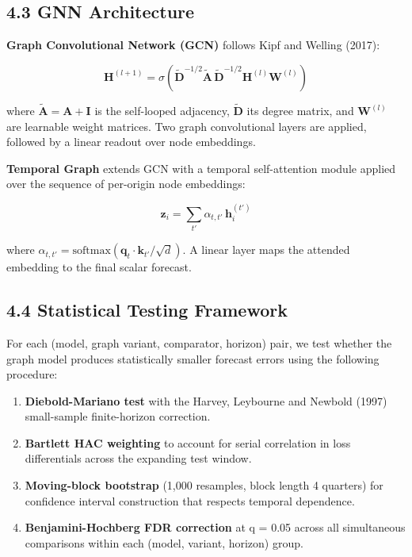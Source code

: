 \documentclass[
  11pt,
  a4paper]{article}
\providecommand{\tightlist}{%
  \setlength{\itemsep}{0pt}\setlength{\parskip}{0pt}}
\begin{document}
\subsection{4.3 GNN Architecture}\label{gnn-architecture}

\textbf{Graph Convolutional Network (GCN)} follows Kipf and Welling
(2017):

\[\mathbf{H}^{(l+1)} = \sigma\!\left(\tilde{\mathbf{D}}^{-1/2}\tilde{\mathbf{A}}\,\tilde{\mathbf{D}}^{-1/2}\mathbf{H}^{(l)}\mathbf{W}^{(l)}\right)\]

where \(\tilde{\mathbf{A}} = \mathbf{A} + \mathbf{I}\) is the
self-looped adjacency, \(\tilde{\mathbf{D}}\) its degree matrix, and
\(\mathbf{W}^{(l)}\) are learnable weight matrices. Two graph
convolutional layers are applied, followed by a linear readout over node
embeddings.

\textbf{Temporal Graph} extends GCN with a temporal self-attention
module applied over the sequence of per-origin node embeddings:

\[\mathbf{z}_i = \sum_{t'} \alpha_{t,t'}\,\mathbf{h}_i^{(t')}\]

where
\(\alpha_{t,t'} = \mathrm{softmax}(\mathbf{q}_t \cdot \mathbf{k}_{t'} / \sqrt{d})\).
A linear layer maps the attended embedding to the final scalar forecast.

\subsection{4.4 Statistical Testing
Framework}\label{statistical-testing-framework}

For each (model, graph variant, comparator, horizon) pair, we test
whether the graph model produces statistically smaller forecast errors
using the following procedure:

\begin{enumerate}
\def\labelenumi{\arabic{enumi}.}
\tightlist
\item
  \textbf{Diebold-Mariano test} with the Harvey, Leybourne and Newbold
  (1997) small-sample finite-horizon correction.
\item
  \textbf{Bartlett HAC weighting} to account for serial correlation in
  loss differentials across the expanding test window.
\item
  \textbf{Moving-block bootstrap} (1,000 resamples, block length 4
  quarters) for confidence interval construction that respects temporal
  dependence.
\item
  \textbf{Benjamini-Hochberg FDR correction} at q = 0.05 across all
  simultaneous comparisons within each (model, variant, horizon) group.
\end{enumerate}
\end{document}
